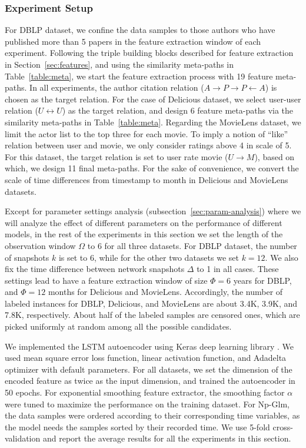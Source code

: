 \subsubsection{Experiment Setup}


For DBLP dataset, we confine the data samples to those authors who have published more than 5 papers in the feature extraction window of each experiment. Following the triple building blocks described for feature extraction in Section~\ref{sec:features}, and using the similarity meta-paths in Table~\ref{table:meta}, we start the feature extraction process with 19 feature meta-paths. In all experiments, the author citation relation ($A\rightarrow P\rightarrow P\leftarrow A$) is chosen as the target relation. 
For the case of Delicious dataset, we select user-user relation ($U\leftrightarrow U$) as the target relation, and design 6 feature meta-paths via the similarity meta-paths in Table~\ref{table:meta}.
Regarding the MovieLens dataset, we limit the actor list to the top three for each movie. To imply a notion of ``like'' relation between user and movie, we only consider ratings above 4 in scale of 5. For this dataset, the target relation is set to user rate movie ($U\rightarrow M$), based on which, we design 11 final meta-paths. For the sake of convenience, we convert the scale of time differences from timestamp to month in Delicious and MovieLens datasets.

{\color{red}Except for parameter settings analysis (subsection~\ref{sec:param-analysis}) where we will analyze the effect of different parameters on the performance of different models, in the rest of the experiments in this section we set the length of the observation window $\Omega$ to 6 for all three datasets. For DBLP dataset, the number of snapshots $k$ is set to 6, while for the other two datasets we set $k=12$. We also fix the time difference between network snapshots $\Delta$ to 1 in all cases. These settings lead to have a feature extraction window of size $\Phi=6$ years for DBLP, and $\Phi=12$ months for Delicious and MovieLens. Accordingly, the number of labeled instances for DBLP, Delicious, and MovieLens are about 3.4K, 3.9K, and 7.8K, respectively. About half of the labeled samples are censored ones, which are picked uniformly at random among all the possible candidates.}

We implemented the LSTM autoencoder using Keras deep learning library \cite{chollet2015keras}. We used mean square error loss function, linear activation function, and Adadelta optimizer \cite{zeiler2012adadelta} with default parameters. For all datasets, we set the dimension of the encoded feature as twice as the input dimension, and trained the autoencoder in 50 epochs. For exponential smoothing feature extractor, the smoothing factor $\alpha$ were tuned to maximize the performance on the training dataset. For Np-Glm, the data samples were ordered according to their corresponding time variables, as the model needs the samples sorted by their recorded time. We use 5-fold cross-validation and report the average results for all the experiments in this section.

